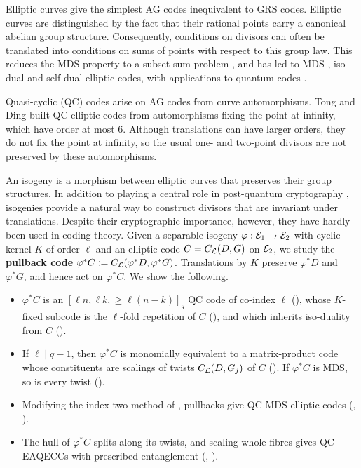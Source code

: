 \documentclass[twocolumn, 11pt]{scrartcl}
\begin{document}
Elliptic curves give the simplest AG codes inequivalent to GRS codes. Elliptic curves are distinguished by the fact that their rational points carry a canonical abelian group structure. Consequently, conditions on divisors can often be translated into conditions on sums of points with respect to this group law. This reduces the MDS property to a subset-sum problem \cite{munuera1993mds,li2015minimum}, and has led to MDS \cite{wang2025nonrs}, iso-dual \cite{zhu2026isodual} and self-dual \cite{jin2019selfdual} elliptic codes, with applications to quantum codes \cite{sok2021new,zhu2026isodual}.

Quasi-cyclic (QC) codes \cite{ling2001algebraic} arise on AG codes from curve automorphisms. Tong and Ding \cite{tong2013quasicyclic} built QC elliptic codes from automorphisms fixing the point at infinity, which have order at most 6. Although translations \cite{ma2023automorphism} can have larger orders, they do not fix the point at infinity, so the usual one- and two-point divisors are not preserved by these automorphisms.

An isogeny is a morphism between elliptic curves that preserves their group structures. In addition to playing a central role in post-quantum cryptography \cite{NISTPQC-ADD-R3:SQIsign26,basso2026prism}, isogenies provide a natural way to construct divisors that are invariant under translations. Despite their cryptographic importance, however, they have hardly been used in coding theory. Given a separable isogeny $\varphi:\mathcal{E}_1\to\mathcal{E}_2$ with cyclic kernel $K$ of order $\ell$ and an elliptic code $C=C_\mathcal{L}(D,G)$ on $\mathcal{E}_2$, we study the \textbf{pullback code} $\varphi^*C:=C_\mathcal{L}(\varphi^*D,\varphi^*G)$. Translations by $K$ preserve $\varphi^*D$ and $\varphi^*G$, and hence act on $\varphi^*C$. We show the following.
\begin{itemize}
    \item $\varphi^*C$ is an $[\ell n,\ell k,\geq\ell(n-k)]_q$ QC code of co-index $\ell$ (), whose $K$-fixed subcode is the $\ell$-fold repetition of $C$ (), and which inherits iso-duality from $C$ ().
    \item If $\ell\mid q-1$, then $\varphi^*C$ is monomially equivalent to a matrix-product code whose constituents are scalings of twists $C_\mathcal{L}(D,G_j)$ of $C$ (). If $\varphi^*C$ is MDS, so is every twist ().
    \item Modifying the index-two method of \cite{wang2025nonrs}, pullbacks give QC MDS elliptic codes (, ).
    \item The hull of $\varphi^*C$ splits along its twists, and scaling whole fibres gives QC EAQECCs with prescribed entanglement (, ).
\end{itemize}
\end{document}
